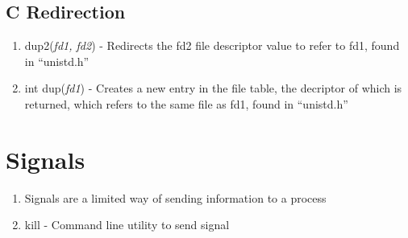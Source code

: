 \documentclass[11 pt, twoside]{article}
\begin{document}
\subsection{C Redirection}
\begin{enumerate}
\item dup2(\textit{fd1, fd2}) - Redirects the fd2 file descriptor value to refer to fd1, found in ``unistd.h''
\item int dup(\textit{fd1}) - Creates a new entry in the file table, the decriptor of which is returned, which refers to the same file as fd1, found in ``unistd.h''
\end{enumerate}

\section{Signals}

\begin{enumerate}
\item Signals are a limited way of sending information to a process
\item kill - Command line utility to send signal 
\end{enumerate}
\end{document}
